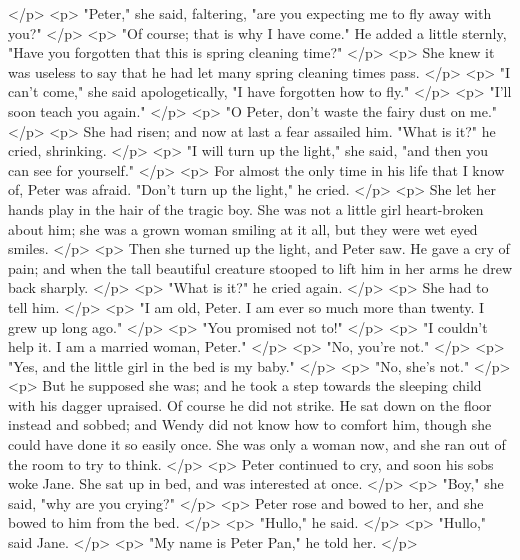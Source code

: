     </p>
    <p>
      "Peter," she said, faltering, "are you expecting me to fly away with you?"
    </p>
    <p>
      "Of course; that is why I have come." He added a little sternly, "Have you
      forgotten that this is spring cleaning time?"
    </p>
    <p>
      She knew it was useless to say that he had let many spring cleaning times
      pass.
    </p>
    <p>
      "I can't come," she said apologetically, "I have forgotten how to fly."
    </p>
    <p>
      "I'll soon teach you again."
    </p>
    <p>
      "O Peter, don't waste the fairy dust on me."
    </p>
    <p>
      She had risen; and now at last a fear assailed him. "What is it?" he
      cried, shrinking.
    </p>
    <p>
      "I will turn up the light," she said, "and then you can see for yourself."
    </p>
    <p>
      For almost the only time in his life that I know of, Peter was afraid.
      "Don't turn up the light," he cried.
    </p>
    <p>
      She let her hands play in the hair of the tragic boy. She was not a little
      girl heart-broken about him; she was a grown woman smiling at it all, but
      they were wet eyed smiles.
    </p>
    <p>
      Then she turned up the light, and Peter saw. He gave a cry of pain; and
      when the tall beautiful creature stooped to lift him in her arms he drew
      back sharply.
    </p>
    <p>
      "What is it?" he cried again.
    </p>
    <p>
      She had to tell him.
    </p>
    <p>
      "I am old, Peter. I am ever so much more than twenty. I grew up long ago."
    </p>
    <p>
      "You promised not to!"
    </p>
    <p>
      "I couldn't help it. I am a married woman, Peter."
    </p>
    <p>
      "No, you're not."
    </p>
    <p>
      "Yes, and the little girl in the bed is my baby."
    </p>
    <p>
      "No, she's not."
    </p>
    <p>
      But he supposed she was; and he took a step towards the sleeping child
      with his dagger upraised. Of course he did not strike. He sat down on the
      floor instead and sobbed; and Wendy did not know how to comfort him,
      though she could have done it so easily once. She was only a woman now,
      and she ran out of the room to try to think.
    </p>
    <p>
      Peter continued to cry, and soon his sobs woke Jane. She sat up in bed,
      and was interested at once.
    </p>
    <p>
      "Boy," she said, "why are you crying?"
    </p>
    <p>
      Peter rose and bowed to her, and she bowed to him from the bed.
    </p>
    <p>
      "Hullo," he said.
    </p>
    <p>
      "Hullo," said Jane.
    </p>
    <p>
      "My name is Peter Pan," he told her.
    </p>
